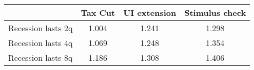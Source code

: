 \begin{tabular}{@{}lccc@{}} 
\toprule 
& Tax Cut    & UI extension    & Stimulus check    \\  \midrule 
Recession lasts 2q &1.004  & 1.241  & 1.298     \\ 
Recession lasts 4q &1.069  & 1.248  & 1.354     \\ 
Recession lasts 8q &1.186  & 1.308  & 1.406     \\ 
\end{tabular}  
